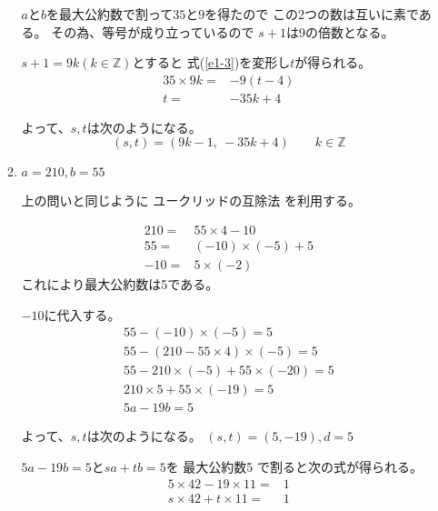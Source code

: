 \documentclass[12pt,b5paper]{ltjsarticle}
\begin{document}
\begin{enumerate}
\begin{enumerate}
            $a$と$b$を最大公約数で割って$35$と$9$を得たので
            この2つの数は互いに素である。
            その為、等号が成り立っているので
            $s+1$は9の倍数となる。

            $s+1=9k (k\in\mathbb{Z})$とすると
            式(\ref{e1-3})を変形し$t$が得られる。
            \begin{align}
             35\times 9k =& -9(t-4)\\
             t=& -35k+4
            \end{align}

            よって、$s,t$は次のようになる。
            \begin{equation}
             (s,t) = ( 9k-1,\ -35k+4 ) \qquad k\in\mathbb{Z}
            \end{equation}


            \hrulefill

       \item
            $a=210,b=55$

            \dotfill

            上の問いと同じように
            ユークリッドの互除法
            を利用する。

            \begin{align}
             210 =& 55\times 4 -10\\
             55 =& (-10)\times (-5) +5\\
             -10 =& 5\times (-2)
            \end{align}
            これにより最大公約数は5である。

            $-10$に代入する。
            \begin{align}
             55 - (-10)\times (-5) = 5\\
             55 - (210-55\times 4)\times (-5) = 5\\
             55 - 210 \times (-5) +55\times (-20) = 5\\
             210\times 5 + 55\times (-19) =5\\
             5a-19b=5
            \end{align}

            よって、$s,t$は次のようになる。
            $(s,t)=(5,-19),d=5$


            $5a-19b=5$と$sa+tb=5$を
            最大公約数5 で割ると次の式が得られる。
            \begin{align}
             5\times 42 -19\times 11 =&1\\
             s\times 42 +t\times 11 =&1
            \end{align}


\end{enumerate}
\end{enumerate}
\end{document}

